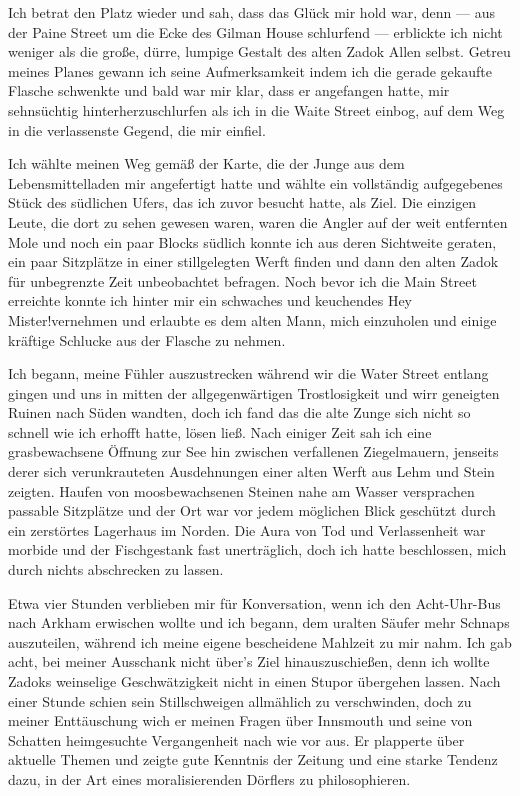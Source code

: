 Ich betrat den Platz wieder und sah, dass das Glück mir hold war, denn --- aus der Paine Street um die Ecke des Gilman House schlurfend --- erblickte ich nicht weniger als die große, dürre, lumpige Gestalt des alten Zadok Allen selbst. Getreu meines Planes gewann ich seine Aufmerksamkeit indem ich die gerade gekaufte Flasche schwenkte und bald war mir klar, dass er angefangen hatte, mir sehnsüchtig hinterherzuschlurfen als ich in die Waite Street einbog, auf dem Weg in die verlassenste Gegend, die mir einfiel.

Ich wählte meinen Weg gemäß der Karte, die der Junge aus dem Lebensmittelladen mir angefertigt hatte und wählte ein vollständig aufgegebenes Stück des südlichen Ufers, das ich zuvor besucht hatte, als Ziel. Die einzigen Leute, die dort zu sehen gewesen waren, waren die Angler auf der weit entfernten Mole und noch ein paar Blocks südlich konnte ich aus deren Sichtweite geraten, ein paar Sitzplätze in einer stillgelegten Werft finden und dann den alten Zadok für unbegrenzte Zeit unbeobachtet befragen. Noch bevor ich die Main Street erreichte konnte ich hinter mir ein schwaches und keuchendes \glqq Hey Mister!\grqq  vernehmen und erlaubte es dem alten Mann, mich einzuholen und einige kräftige Schlucke aus der Flasche zu nehmen.

Ich begann, meine Fühler auszustrecken während wir die Water Street entlang gingen und uns in mitten der allgegenwärtigen Trostlosigkeit und wirr geneigten Ruinen nach Süden wandten, doch ich fand das die alte Zunge sich nicht so schnell wie ich erhofft hatte, lösen ließ. Nach einiger Zeit sah ich eine grasbewachsene Öffnung zur See hin zwischen verfallenen Ziegelmauern, jenseits derer sich verunkrauteten Ausdehnungen einer alten Werft aus Lehm und Stein zeigten. Haufen von moosbewachsenen Steinen nahe am Wasser versprachen passable Sitzplätze und der Ort war vor jedem möglichen Blick geschützt durch ein zerstörtes Lagerhaus im Norden. Die Aura von Tod und Verlassenheit war morbide und der Fischgestank fast unerträglich, doch ich hatte beschlossen, mich durch nichts abschrecken zu lassen.

Etwa vier Stunden verblieben mir für Konversation, wenn ich den Acht-Uhr-Bus nach Arkham erwischen wollte und ich begann, dem uralten Säufer mehr Schnaps auszuteilen, während ich meine eigene bescheidene Mahlzeit zu mir nahm. Ich gab acht, bei meiner Ausschank nicht über's Ziel hinauszuschießen, denn ich wollte Zadoks weinselige Geschwätzigkeit nicht in einen Stupor übergehen lassen. Nach einer Stunde schien sein Stillschweigen allmählich zu verschwinden, doch zu meiner Enttäuschung wich er meinen Fragen über Innsmouth und seine von Schatten heimgesuchte Vergangenheit nach wie vor aus. Er plapperte über aktuelle Themen und zeigte gute Kenntnis der Zeitung und eine starke Tendenz dazu, in der Art eines moralisierenden Dörflers zu philosophieren.

